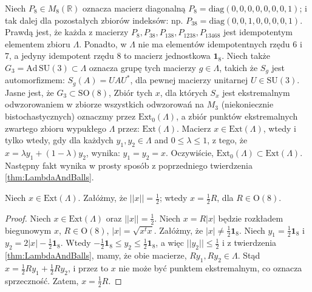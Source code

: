 Niech $P_{8} \in M_{8}(\mathbb{R})$ oznacza macierz diagonalną
$P_{8} = \text{diag}(0,0,0,0,0,0,0,1)$;
i tak dalej dla pozostałych zbiorów indeksów: np.
$P_{38} = \text{diag}(0,0,1,0,0,0,0,1)$.
Prawdą jest, że każda z macierzy
$P_{8}, P_{38}, P_{138}, P_{1238}, P_{13468}$ jest idempotentym elementem
zbioru $\Lambda$.
Ponadto, w $\Lambda$ nie ma elementów idempotentnych rzędu 6 i 7,
a jedyny idempotent rzędu 8 to macierz jednostkowa $\mathbf{1}_{8}$.
Niech także $G_{3} = \text{Ad} \, \text{SU}(3) \subset \Lambda$ oznacza
grupę tych macierzy $g \in \Lambda$, takich że
$S_{g}$ jest automorfizmem: $S_{g}(A) = U A U^{*}$,
dla pewnej macierzy unitarnej $U \in \text{SU}(3)$.
Jasne jest, że $G_{3} \subset \text{SO}(8)$,
Zbiór tych $x$, dla których $S_{x}$ jest ekstremalnym
odwzorowaniem w zbiorze wszystkich odwzorowań na $M_{3}$
(niekoniecznie bistochastycznych) oznaczmy przez
$\text{Ext}_{0}(\Lambda)$,
a zbiór punktów ekstremalnych zwartego zbioru wypukłego
$\Lambda$ przez: $\text{Ext}(\Lambda)$.
Macierz $x \in \text{Ext}(\Lambda)$,
wtedy i tylko wtedy, gdy dla każdych
$y_{1}, y_{2} \in \Lambda$ and $0 \leq \lambda \leq 1$,
z tego, że $x = \lambda y_{1} + (1-\lambda) y_{2}$,
wynika: $y_{1} = y_{2} = x$.
Oczywiście, $\text{Ext}_{0}(\Lambda) \subset \text{Ext}(\Lambda)$.
Następny fakt wynika w prosty sposób z poprzedniego twierdzenia
\ref{thm:LambdaAndBalls}.

\begin{Theorem}
    \label{thm:oneHalfofOrthogonal}
    Niech $x \in \mathrm{Ext}(\Lambda)$.
Załóżmy, że $||x|| = \frac{1}{2}$;
wtedy $ x = \frac{1}{2} R$, dla $R \in \mathrm{O}(8)$.
\end{Theorem}
\begin{proof}
Niech $x \in \mathrm{Ext}(\Lambda)$ oraz $||x|| = \frac{1}{2}$.
Niech $x = R |x|$ będzie rozkładem biegunowym $x$,
    $R \in \text{O}(8)$, $|x| = \sqrt{x^{t} x}$.
Załóżmy, że $|x| \neq \frac{1}{2} \mathbf{1}_{8}$.
Niech $y_{1} = \frac{1}{2} \mathbf{1}_{8}$ i
    $y_{2} = 2 |x| - \frac{1}{2} \mathbf{1}_{8}$.
Wtedy $- \frac{1}{2} \mathbf{1}_{8} \leq y_{2} \leq \frac{1}{2} \mathbf{1}_{8}$,
a więc $|| y_{2} || \leq \frac{1}{2}$
i z twierdzenia \ref{thm:LambdaAndBalls},
mamy, że obie macierze, $R y_{1}, R y_{2} \in \Lambda$.
Stąd $x = \frac{1}{2} R y_{1} + \frac{1}{2} R y_{2}$,
i przez to $x$ nie może być punktem ekstremalnym, co oznacza sprzeczność.
Zatem, $x = \frac{1}{2} R$.
\end{proof}


